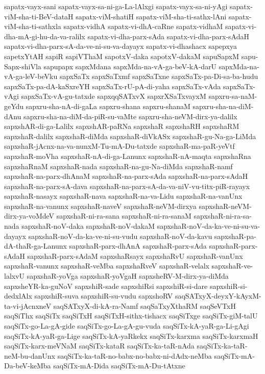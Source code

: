 {sapatx-vayx-sani
sapatx-vayx-sa-ni-ga-La-lAlxgi
sapatx-vayx-sa-ni-yAgi
sapatx-viM-sha-ti-BeV-dataH
sapatx-viM-shatiH
sapatx-viM-sha-ti-sathx-lAni
sapatx-viM-sha-ti-sathxla
sapatx-vidhA
sapatx-vi-dhA-caRne
sapatx-vidhaM
sapatx-vi-dha-mA-gi-hu-da-va-ralilx
sapatx-vi-dha-parx-sAda
sapatx-vi-dha-parx-sAdaH
sapatx-vi-dha-parx-sA-da-ve-ni-su-va-dayayx
sapatx-vi-dhashacx
sapepxya
sapetxYtAH
sapiR
sapiVThaM
sapotxV-daka
sapotxV-dakaM
sapuSapxM
sapu-Sapx-shiVla
sapupapx
sapxMdana
sapxMda-na-vA-ga-beV-kA-darU
sapxMda-na-vA-ga-leV-beVku
sapxSaTx
sapxSaTxmf
sapxSaTxne
sapxSaTx-pa-Di-sa-ba-hudu
sapxSaTx-pa-dA-kaSxreYH
sapxSaTx-rU-pA-di-yaha
sapxSaTx-vAda
sapxSaTx-vAgi
sapxSaTx-vA-gu-tatxde
sapxqqSATxvX
sapxrXSaTxvayxM
sapxru-sa-naM-geYdu
sapxru-sha-nA-di-gaLa
sapxru-shana
sapxru-shanaM
sapxru-sha-na-diM-dAnu
sapxru-sha-na-diM-da-piR-su-vaMte
sapxru-sha-neVM-dirx-ya-dalilx
sapxshAR-di-ga-Lalilx
sapxshAR-paRNa
sapxshaR
sapxshaRH
sapxshaRM
sapxshaR-dalilx
sapxshaR-diMda
sapxshaR-diVkASx
sapxshaR-gu-Na-ga-LiMda
sapxshaR-jAcnx-na-va-nunxM-Tu-mA-Du-tatxde
sapxshaR-ma-paR-yeVtf
sapxshaR-moVha
sapxshaR-nA-di-ga-Lanunx
sapxshaR-nA-maqta
sapxshaRna
sapxshaRnaM
sapxshaR-nada
sapxshaR-na-gu-Na-diMda
sapxshaR-namf
sapxshaR-na-parx-dhAnaM
sapxshaR-na-parx-sAda
sapxshaR-na-parx-sAdaH
sapxshaR-na-parx-sA-dava
sapxshaR-na-parx-sA-da-va-niV-vu-titx-piR-rayayx
sapxshaR-nasayx
sapxshaR-nava
sapxshaR-na-va-Lidu
sapxshaR-na-vanUnx
sapxshaR-na-vanunx
sapxshaR-naveV
sapxshaR-neVM-dirxya
sapxshaR-neVM-dirx-ya-voMdeV
sapxshaR-ni-ra-sana
sapxshaR-ni-ra-sanaM
sapxshaR-ni-ra-sa-nada
sapxshaR-noV-daka
sapxshaR-noV-dakaM
sapxshaR-noV-da-ka-ve-ni-su-va-dayayx
sapxshaR-noV-da-ka-ve-ni-su-vudu
sapxshaR-noV-da-kavu
sapxshaR-pa-dA-thaR-ga-Lanunx
sapxshaR-parx-dhAnA
sapxshaR-parx-sAda
sapxshaR-parx-sAdaH
sapxshaR-parx-sAdaM
sapxshaRsayx
sapxshaRvU
sapxshaR-vanUnx
sapxshaR-vanunx
sapxshaR-veMba
sapxshaRveV
sapxshaR-velalx
sapxshaR-ve-lalxvU
sapxshaR-yoVga
sapxshaR-yoVgaH
sapxsheRV-M-dirx-ya-diMda
sapxsheYR-ka-guNoV
sapxshiR-sade
sapxshiRsi
sapxshiR-si-dare
sapxshiR-si-dedxlAlx
sapxshiR-suva
sapxshiR-su-vudu
sapxshoRV
saqSATxyX-deyxY-kAyxM-ta-vi-jAcnxneV
saqSATxyX-di-kA-ra-Namf
saqSaTxyXthaRM
saqSeVTxH
saqSiThx
saqSiTx
saqSiTxH
saqSiTxH-sithx-tishacx
saqSiTxge
saqSiTx-giM-talU
saqSiTx-go-La-gA-gide
saqSiTx-go-La-gA-gu-vuda
saqSiTx-kA-yaR-ga-Li-gAgi
saqSiTx-kA-yaR-ga-Lige
saqSiTx-kA-yaRkekx
saqSiTx-karxma
saqSiTx-karxmaH
saqSiTx-karx-meVNaM
saqSiTx-kataR
saqSiTx-ka-taR-nAda
saqSiTx-ka-taR-neM-bu-danUnx
saqSiTx-ka-taR-no-babx-no-babx-ni-dAdx-neMba
saqSiTx-mA-Da-beV-keMba
saqSiTx-mA-Dida
saqSiTx-mA-Du-tAtxne
}
